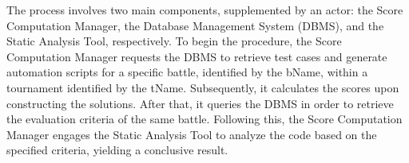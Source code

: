 The process involves two main components, supplemented by an actor: the Score Computation Manager, the Database Management System (DBMS), and the Static Analysis Tool, respectively. To begin the procedure, the Score Computation Manager requests the DBMS to retrieve test cases and generate automation scripts for a specific battle, identified by the bName, within a tournament identified by the tName. Subsequently, it calculates the scores upon constructing the solutions. After that, it queries the DBMS in order to retrieve the evaluation criteria of the same battle. Following this, the Score Computation Manager engages the Static Analysis Tool to analyze the code based on the specified criteria, yielding a conclusive result.


\newpage



